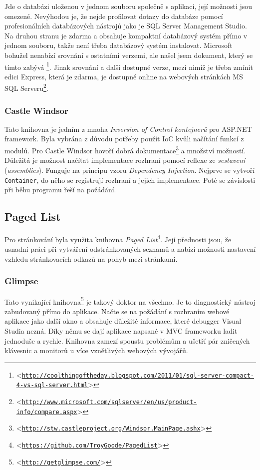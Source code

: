 \documentclass[11pt,twoside,a4paper]{book}
\let\oldUrl\url
\renewcommand\url[1]{<\texttt{\oldUrl{#1}}>}
\begin{document}
Jde o databázi uloženou v jednom souboru společně s aplikací, její možnosti jsou omezené. Nevýhodou je, že nejde profilovat dotazy do databáze pomocí profesionálních databázových nástrojů jako je SQL Server Management Studio. Na druhou stranu je zdarma a obsahuje kompaktní databázový systém přímo v jednom souboru, takže není třeba databázový systém instalovat. Microsoft bohužel nenabízí srovnání s ostatními verzemi, ale našel jsem dokument, který se tímto zabývá \footnote{\url{http://coolthingoftheday.blogspot.com/2011/01/sql-server-compact-4-vs-sql-server.html}}. Jinak srovnání a další dostupné verze, mezi nimiž je třeba zmínit edici Express, která je zdarma, je dostupné online na webových stránkách MS SQL Serveru\footnote{\url{http://www.microsoft.com/sqlserver/en/us/product-info/compare.aspx}}.


\subsubsection{Castle Windsor}
Tato knihovna je jedním z mnoha \textit{Inversion of Control kontejnerů} pro ASP.NET framework. Byla vybrána z důvodu potřeby použít IoC kvůli načítání funkcí z modulů. Pro Castle Windsor hovoří dobrá dokumentace\footnote{\url{http://stw.castleproject.org/Windsor.MainPage.ashx}} a množství možností. Důležitá je možnost načítat implementace rozhraní pomocí reflexe ze \textit{sestavení} (\textit{assemblies}). Funguje na principu vzoru \textit{Dependency Injection}. Nejprve se vytvoří \texttt{Container}, do něho se registrují rozhraní a jejich implementace. Poté se závislosti při běhu programu řeší na požádání.

\subsection{Paged List}
Pro stránkování byla využita knihovna \textit{Paged List}\footnote{\url{https://github.com/TroyGoode/PagedList}}. Její přednosti jsou, že usnadní práci při vytváření odstránkovaných seznamů a nabízí možnosti nastavení vzhledu stránkovacích odkazů na pohyb mezi stránkami.

\subsubsection{Glimpse}
Tato vynikající knihovna\footnote{\url{http://getglimpse.com/}} je takový doktor na všechno. Je to diagnostický nástroj zabudovaný přímo do aplikace. Načte se na požádání s rozhraním webové aplikace jako další okno a obsahuje důležité informace, které debugger Visual Studia nezná. Díky němu se dají aplikace napsané v MVC frameworku ladit jednoduše a rychle. Knihovna zamezí spoustu problémům a ušetří pár zničených klávesnic a monitorů u více vznětlivých webových vývojářů.
\end{document}
